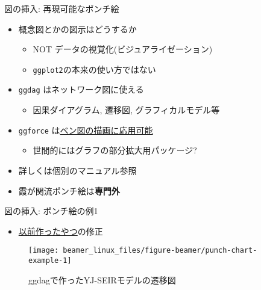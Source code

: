 \documentclass[
  12pt,
  ignorenonframetext,
]{beamer}
\providecommand{\tightlist}{%
  \setlength{\itemsep}{0pt}\setlength{\parskip}{0pt}}
\begin{document}
\begin{frame}[fragile]{図の挿入: 再現可能なポンチ絵}
\protect\hypertarget{ux56f3ux306eux633fux5165-ux518dux73feux53efux80fdux306aux30ddux30f3ux30c1ux7d75}{}

\begin{itemize}
\tightlist
\item
  概念図とかの図示はどうするか

  \begin{itemize}
  \tightlist
  \item
    NOT データの視覚化(ビジュアライゼーション)
  \item
    \texttt{ggplot2}の本来の使い方ではない
  \end{itemize}
\item
  \texttt{ggdag} はネットワーク図に使える

  \begin{itemize}
  \tightlist
  \item
    因果ダイアグラム, 遷移図, グラフィカルモデル等
  \end{itemize}
\item
  \texttt{ggforce}
  は\href{https://rpubs.com/sdutky/559050}{ベン図の描画に応用可能}

  \begin{itemize}
  \tightlist
  \item
    世間的にはグラフの部分拡大用パッケージ?
  \end{itemize}
\item
  詳しくは個別のマニュアル参照
\item
  霞が関流ポンチ絵は\textbf{専門外}
\end{itemize}

\end{frame}

\begin{frame}{図の挿入: ポンチ絵の例1}
\protect\hypertarget{ux56f3ux306eux633fux5165-ux30ddux30f3ux30c1ux7d75ux306eux4f8b1}{}

\begin{itemize}
\tightlist
\item
  \href{https://speakerdeck.com/ktgrstsh/r-and-epidemical-mathematical-models}{以前作ったやつ}の修正
\end{itemize}

\begin{figure}

{\centering \texttt{[image: beamer\_linux\_files/figure-beamer/punch-chart-example-1]} 

}

\caption{ggdagで作ったYJ-SEIRモデルの遷移図}\label{fig:punch-chart-example}
\end{figure}

\end{frame}
\end{document}
